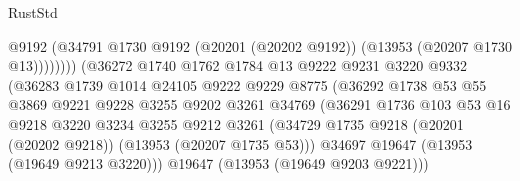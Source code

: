 \begin{lexlean}{RustStd}
\begin{coremodule}
                                            @9192
                                            (@34791
                                              @1730
                                              @9192
                                              (@20201 (@20202 @9192))
                                              (@13953 (@20207 @1730 @13))))))))
                                  (@36272
                                    @1740
                                    @1762
                                    @1784
                                    @13
                                    @9222
                                    @9231
                                    @3220
                                    @9332
                                    (@36283
                                      @1739
                                      @1014
                                      @24105
                                      @9222
                                      @9229
                                      @8775
                                      (@36292
                                        @1738
                                        @53
                                        @55
                                        @3869
                                        @9221
                                        @9228
                                        @3255
                                        @9202
                                        @3261
                                        @34769
                                        (@36291
                                          @1736
                                          @103
                                          @53
                                          @16
                                          @9218
                                          @3220
                                          @3234
                                          @3255
                                          @9212
                                          @3261
                                          (@34729
                                            @1735
                                            @9218
                                            (@20201 (@20202 @9218))
                                            (@13953 (@20207 @1735 @53)))
                                          @34697
                                          @19647
                                          (@13953 (@19649 @9213 @3220)))
                                        @19647
                                        (@13953 (@19649 @9203 @9221)))

\end{coremodule}
\end{lexlean}
